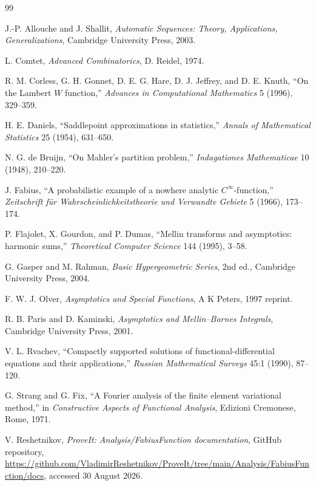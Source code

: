 \documentclass[11pt,oneside]{article}
\theoremstyle{definition}
\theoremstyle{remark}
\begin{document}
\begin{thebibliography}{99}

J.-P. Allouche and J. Shallit,
\emph{Automatic Sequences: Theory, Applications, Generalizations},
Cambridge University Press, 2003.

L. Comtet,
\emph{Advanced Combinatorics},
D. Reidel, 1974.

R. M. Corless, G. H. Gonnet, D. E. G. Hare, D. J. Jeffrey, and
D. E. Knuth,
``On the Lambert \(W\) function,''
\emph{Advances in Computational Mathematics} 5 (1996), 329--359.

H. E. Daniels,
``Saddlepoint approximations in statistics,''
\emph{Annals of Mathematical Statistics} 25 (1954), 631--650.

N. G. de Bruijn,
``On Mahler's partition problem,''
\emph{Indagationes Mathematicae} 10 (1948), 210--220.

J. Fabius,
``A probabilistic example of a nowhere analytic \(C^\infty\)-function,''
\emph{Zeitschrift f\"ur Wahrscheinlichkeitstheorie und Verwandte Gebiete}
5 (1966), 173--174.

P. Flajolet, X. Gourdon, and P. Dumas,
``Mellin transforms and asymptotics: harmonic sums,''
\emph{Theoretical Computer Science} 144 (1995), 3--58.

G. Gasper and M. Rahman,
\emph{Basic Hypergeometric Series}, 2nd ed.,
Cambridge University Press, 2004.

F. W. J. Olver,
\emph{Asymptotics and Special Functions},
A K Peters, 1997 reprint.

R. B. Paris and D. Kaminski,
\emph{Asymptotics and Mellin--Barnes Integrals},
Cambridge University Press, 2001.

V. L. Rvachev,
``Compactly supported solutions of functional-differential equations and
their applications,''
\emph{Russian Mathematical Surveys} 45:1 (1990), 87--120.

G. Strang and G. Fix,
``A Fourier analysis of the finite element variational method,''
in \emph{Constructive Aspects of Functional Analysis},
Edizioni Cremonese, Rome, 1971.

V. Reshetnikov,
\emph{ProveIt: Analysis/FabiusFunction documentation},
GitHub repository,
\url{https://github.com/VladimirReshetnikov/ProveIt/tree/main/Analysis/FabiusFunction/docs},
accessed 30 August 2026.

\end{thebibliography}
\end{document}
